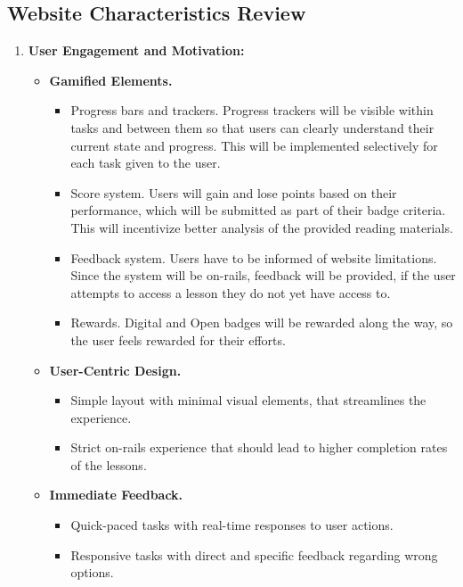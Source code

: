 \subsection{Website Characteristics Review}

\begin{enumerate}
    \item \textbf{User Engagement and Motivation:} 
    \begin{itemize}
        \item \textbf{Gamified Elements.}
        \begin{itemize}
            \item Progress bars and trackers. Progress trackers will be visible within tasks and between them so that users can clearly understand their current state and progress. 
            This will be implemented selectively for each task given to the user.
            \item Score system. Users will gain and lose points based on their performance, which will be submitted as part of their badge criteria.
            This will incentivize better analysis of the provided reading materials.
            \item Feedback system. Users have to be informed of website limitations. 
            Since the system will be on-rails, feedback will be provided, if the user attempts to access a lesson they do not yet have access to.
            \item Rewards. Digital and Open badges will be rewarded along the way, so the user feels rewarded for their efforts.
        \end{itemize}
        \item \textbf{User-Centric Design.}
        \begin{itemize}
            \item Simple layout with minimal visual elements, that streamlines the experience.
            \item Strict on-rails experience that should lead to higher completion rates of the lessons.
        \end{itemize}
        \item \textbf{Immediate Feedback.}
        \begin{itemize}
            \item Quick-paced tasks with real-time responses to user actions.
            \item Responsive tasks with direct and specific feedback regarding wrong options.
        \end{itemize}

\end{itemize}
\end{enumerate}
